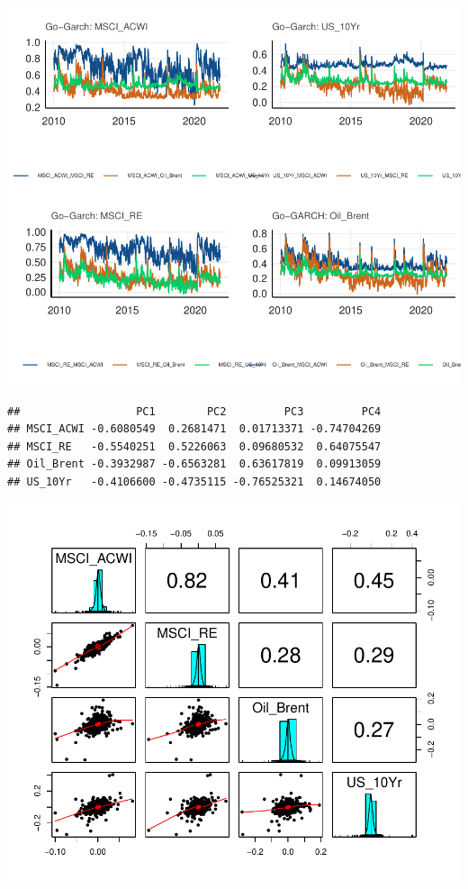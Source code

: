 \documentclass[11pt,preprint, authoryear]{elsarticle}
\numberwithin{equation}{section}
\numberwithin{figure}{section}
\numberwithin{table}{section}
\begin{document}
\includegraphics{Question6_files/figure-latex/unnamed-chunk-10-1.pdf}

\begin{verbatim}
##                  PC1        PC2         PC3         PC4
## MSCI_ACWI -0.6080549  0.2681471  0.01713371 -0.74704269
## MSCI_RE   -0.5540251  0.5226063  0.09680532  0.64075547
## Oil_Brent -0.3932987 -0.6563281  0.63617819  0.09913059
## US_10Yr   -0.4106600 -0.4735115 -0.76525321  0.14674050
\end{verbatim}

\includegraphics{Question6_files/figure-latex/unnamed-chunk-11-1.pdf}
\end{document}
